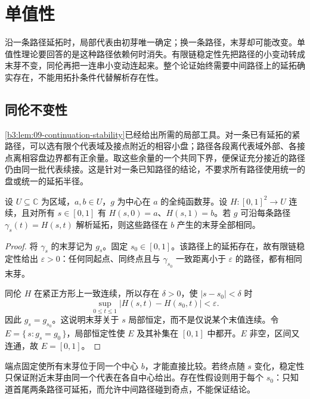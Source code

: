 \section{单值性}
\label{b3:sec:0903}

沿一条路径延拓时，局部代表由初芽唯一确定；换一条路径，末芽却可能改变。单值性理论要回答的是这种路径依赖何时消失。有限链稳定性先把路径的小变动转成末芽不变，同伦再把一连串小变动连起来。整个论证始终需要中间路径上的延拓确实存在，不能用拓扑条件代替解析存在性。

\subsection{同伦不变性}
\label{b3:subsec:090301}

\cref{b3:lem:09-continuation-stability}已经给出所需的局部工具。对一条已有延拓的紧路径，可以选有限个代表域及接点附近的相容小盘；路径各段离代表域外部、各接点离相容盘边界都有正余量。取这些余量的一个共同下界，便保证充分接近的路径仍由同一批代表续接。这是针对一条已知路径的结论，不要求所有路径使用统一的盘或统一的延拓半径。

\begin{theorem}[解析延拓的同伦不变性]\label{b3:thm:09-homotopy-continuation}
设 \(U\subseteq\mathbb C\) 为区域，\(a,b\in U\)，\(g\) 为中心在 \(a\) 的全纯函数芽。设 \(H:[0,1]^2\rightarrow U\) 连续，且对所有 \(s\in[0,1]\) 有 \(H(s,0)=a\)、\(H(s,1)=b\)。若 \(g\) 可沿每条路径 \(\gamma_s(t)=H(s,t)\) 解析延拓，则这些路径在 \(b\) 产生的末芽全部相同。
\end{theorem}
\begin{proof}
将 \(\gamma_s\) 的末芽记为 \(g_s\)。固定 \(s_0\in[0,1]\)。该路径上的延拓存在，故有限链稳定性给出 \(\varepsilon>0\)：任何同起点、同终点且与 \(\gamma_{s_0}\) 一致距离小于 \(\varepsilon\) 的路径，都有相同末芽。

同伦 \(H\) 在紧正方形上一致连续，所以存在 \(\delta>0\)，使 \(|s-s_0|<\delta\) 时
\[
 \sup_{0\le t\le1}|H(s,t)-H(s_0,t)|<\varepsilon.
\]
因此 \(g_s=g_{s_0}\)。这说明末芽关于 \(s\) 局部恒定，而不是仅说某个末值连续。令 \(E=\{\,s:g_s=g_0\,\}\)，局部恒定性使 \(E\) 及其补集在 \([0,1]\) 中都开。\(E\) 非空，区间又连通，故 \(E=[0,1]\)。
\end{proof}

端点固定使所有末芽位于同一个中心 \(b\)，才能直接比较。若终点随 \(s\) 变化，稳定性只保证附近末芽由同一个代表在各自中心给出。存在性假设则用于每个 \(s_0\)：只知道首尾两条路径可延拓，而允许中间路径碰到奇点，不能保证结论。

